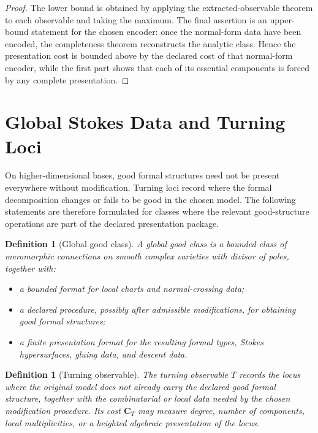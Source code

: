 \documentclass[11pt]{article}
\newtheorem{definition}[theorem]{Definition}
\begin{document}
\begin{proof}
The lower bound is obtained by applying the extracted-observable theorem to each observable and taking the maximum.  The final assertion is an upper-bound statement for the chosen encoder: once the normal-form data have been encoded, the completeness theorem reconstructs the analytic class.  Hence the presentation cost is bounded above by the declared cost of that normal-form encoder, while the first part shows that each of its essential components is forced by any complete presentation.
\end{proof}

\section{Global Stokes Data and Turning Loci}

On higher-dimensional bases, good formal structures need not be present everywhere without modification.  Turning loci record where the formal decomposition changes or fails to be good in the chosen model.  The following statements are therefore formulated for classes where the relevant good-structure operations are part of the declared presentation package.

\begin{definition}[Global good class]
A global good class is a bounded class of meromorphic connections on smooth complex varieties with divisor of poles, together with:
\begin{itemize}[leftmargin=2em]
\item a bounded format for local charts and normal-crossing data;
\item a declared procedure, possibly after admissible modifications, for obtaining good formal structures;
\item a finite presentation format for the resulting formal types, Stokes hypersurfaces, gluing data, and descent data.
\end{itemize}
\end{definition}

\begin{definition}[Turning observable]
The turning observable \(T\) records the locus where the original model does not already carry the declared good formal structure, together with the combinatorial or local data needed by the chosen modification procedure.  Its cost \(\mathbf C_T\) may measure degree, number of components, local multiplicities, or a heighted algebraic presentation of the locus.
\end{definition}
\end{document}
